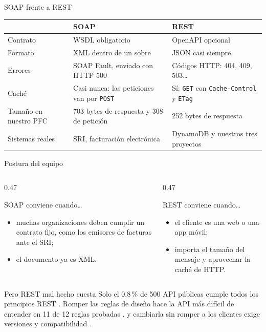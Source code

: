 \begin{frame}{SOAP frente a REST}
\small
\begin{tabularx}{\linewidth}{@{}l X X@{}}
\toprule
 & SOAP & REST \\
\midrule
Contrato & WSDL obligatorio \cite{w3c_wsdl11} & OpenAPI opcional \cite{openapi31} \\
Formato & XML dentro de un sobre & JSON casi siempre \\
Errores & SOAP Fault, enviado con HTTP 500 & Códigos HTTP: 404, 409, 503\dots{} \cite{rfc9110} \\
Caché & Casi nunca: las peticiones van por \texttt{POST} & Sí: \texttt{GET} con \texttt{Cache-Control} y \texttt{ETag} \cite{rfc9111} \\
Tamaño en nuestro PFC & 703 bytes de respuesta y 308 de petición & 252 bytes de respuesta \\
Sistemas reales & SRI, facturación electrónica & DynamoDB y nuestros tres proyectos \\
\bottomrule
\end{tabularx}
\end{frame}

\begin{frame}{Postura del equipo}
\begin{columns}[T]
\begin{column}{0.47\textwidth}
\begin{block}{SOAP conviene cuando\dots}
\begin{itemize}
\item muchas organizaciones deben cumplir un contrato fijo, como los emisores de facturas ante el SRI;
\item el documento ya es XML.
\end{itemize}
\end{block}
\end{column}
\begin{column}{0.47\textwidth}
\begin{block}{REST conviene cuando\dots}
\begin{itemize}
\item el cliente es una web o una app móvil;
\item importa el tamaño del mensaje y aprovechar la caché de HTTP.
\end{itemize}
\end{block}
\end{column}
\end{columns}
\vspace{10pt}
\begin{alertblock}{Pero REST mal hecho cuesta}
Solo el 0,8\,\% de 500 API públicas cumple todos los principios REST \cite{neumann2021}. Romper las reglas de diseño hace la API más difícil de entender en 11 de 12 reglas probadas \cite{bogner2023}, y cambiarla sin romper a los clientes exige versiones y compatibilidad \cite{lercher2024}.
\end{alertblock}
\end{frame}
